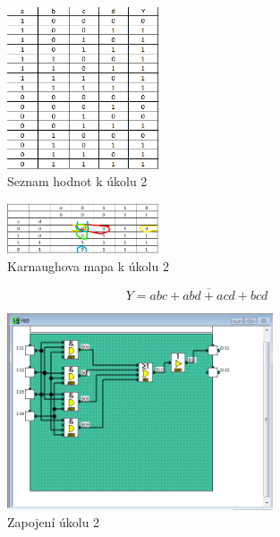\documentclass[12pt,a4paper]{article}
\begin{document}
\begin{figure}[H]
	\centering
	\includegraphics[width=0.4\textwidth]{hodnoty1.png}
	\caption{Seznam hodnot k úkolu 2}
	\label{fig:hodnoty1}
\end{figure}
\begin{figure}[H]
	\centering
	\includegraphics[width=0.4\textwidth]{hodnoty3.png}
	\caption{Karnaughova mapa k úkolu 2}
	\label{fig:hodnoty2}
\end{figure}

\begin{equation}
	Y = \overline{abc + abd + acd +bcd}
\end{equation}
\begin{figure}[H]
	\centering
	\includegraphics[width=0.7\textwidth]{PLC_2.png}
	\caption{Zapojení úkolu 2}
	\label{fig:mesh2}
\end{figure}
\end{document}
